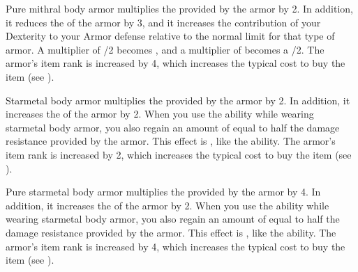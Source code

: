          Pure mithral body armor multiplies the  provided by the armor by 2.
        In addition, it reduces the  of the armor by 3, and it increases the contribution of your Dexterity to your Armor defense relative to the normal limit for that type of armor.
        A multiplier of /2 becomes , and a multiplier of  becomes a /2.
        The armor's item rank is increased by 4, which increases the typical cost to buy the item (see ).

         Starmetal body armor multiplies the  provided by the armor by 2.
        In addition, it increases the  of the armor by 2.
        When you use the  ability while wearing starmetal body armor, you also regain an amount of  equal to half the damage resistance provided by the armor.
        This effect is , like the  ability.
        The armor's item rank is increased by 2, which increases the typical cost to buy the item (see ).

         Pure starmetal body armor multiplies the  provided by the armor by 4.
        In addition, it increases the  of the armor by 2.
        When you use the  ability while wearing starmetal body armor, you also regain an amount of  equal to half the damage resistance provided by the armor.
        This effect is , like the  ability.
        The armor's item rank is increased by 4, which increases the typical cost to buy the item (see ).

